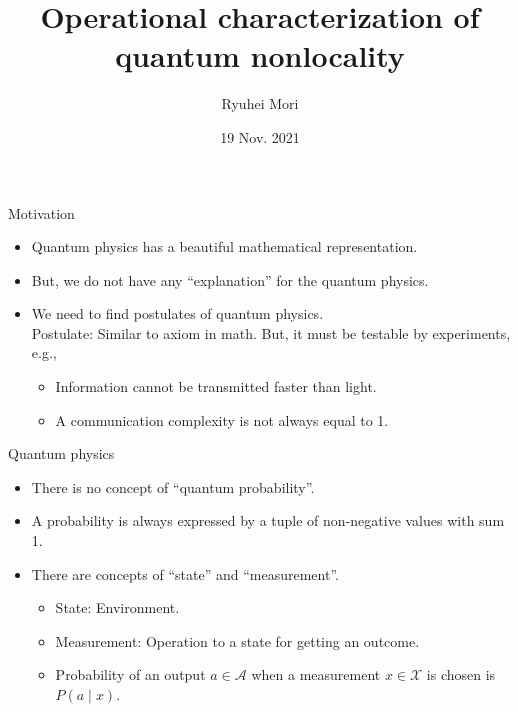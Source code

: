 \documentclass{beamer}
\title{Operational characterization of quantum nonlocality}
\author{Ryuhei Mori}
\institute{Tokyo Institute of Technology}
\date{19 Nov. 2021}
\newcommand\emm[1]{\textcolor{redorange}{{#1}}}
\begin{document}
\begin{frame}[plain]
\maketitle
\end{frame}

\begin{frame}{Motivation}
\begin{itemize}
\setlength{\itemsep}{3.0em}
\item Quantum physics has a beautiful mathematical representation.
\item But, we do not have any ``explanation'' for the quantum physics.
\item We need to find \emm{postulates} of quantum physics.\\
\vspace{1em}
Postulate: Similar to axiom in math. But, it must be testable by experiments, e.g.,
\begin{itemize}
\item Information cannot be transmitted faster than light.
\item A communication complexity is not always equal to 1.
\end{itemize}
\end{itemize}
\end{frame}


\begin{frame}{Quantum physics}
\begin{itemize}
\setlength{\itemsep}{3.5em}
\item There is no concept of ``quantum probability''.
\item A probability is always expressed by a tuple of non-negative values with sum 1.
\item There are concepts of ``\emm{state}'' and ``\emm{measurement}''.
\begin{itemize}
\item State: Environment.
\item Measurement: Operation to a state for getting an outcome.
\item Probability of an output $a\in\mathcal{A}$ when a measurement $x\in\mathcal{X}$ is chosen is $P(a\mid x)$.
\end{itemize}
\end{itemize}
\end{frame}
\end{document}
